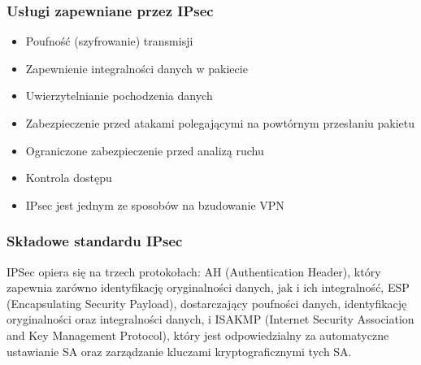 \documentclass[main.tex]{subfiles}
\begin{document}
    \subsubsection{Usługi zapewniane przez IPsec}
    \begin{itemize}
        \item Poufność (szyfrowanie) transmisji
        \item Zapewnienie integralności danych w pakiecie
        \item Uwierzytelnianie pochodzenia danych
        \item Zabezpieczenie przed atakami polegającymi na powtórnym przesłaniu pakietu
        \item Ograniczone zabezpieczenie przed analizą ruchu
        \item Kontrola dostępu
        \item IPsec jest jednym ze sposobów na bzudowanie VPN
    \end{itemize}

    \subsubsection{Składowe standardu IPsec}
    IPSec opiera się na trzech protokołach: AH (Authentication Header), który zapewnia zarówno identyfikację oryginalności danych, jak i ich integralność, ESP (Encapsulating Security Payload), dostarczający poufności danych, identyfikację oryginalności oraz integralności danych, i ISAKMP (Internet Security Association and Key Management Protocol), który jest odpowiedzialny za automatyczne ustawianie SA oraz zarządzanie kluczami kryptograficznymi tych SA.
\end{document}
